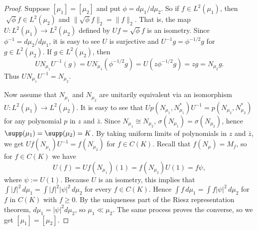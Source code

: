 \begin{proof}
Suppose $[\mu_1]=[\mu_2]$ and put $\phi=d\mu_1/d\mu_2$. So if $f\in L^2(\mu_1)$, then $\sqrt[]{\phi}f\in L^2(\mu_2)$ and $\|\sqrt{\phi}f\|_2=\|f\|_2$. That is, the map $U:L^2(\mu_1)\to L^2(\mu_2)$ defined by $Uf=\sqrt{\phi}f$ is an isometry. Since $\phi^{-1}=d\mu_2/d\mu_1$, it is easy to see $U$ is surjective and $U^{-1}g=\phi^{-1/2}g$ for $g\in L^2(\mu_2)$. If $g\in L^2(\mu_2)$, then
\[UN_{\mu_1}U^{-1}(g)=UN_{\mu_1}(\phi^{-1/2}g)=U(z\phi^{-1/2}g)=zg=N_{\mu_2}g.\]
Thus $UN_{\mu_1}U^{-1}=N_{\mu_2}$.\par
Now assume that $N_{\mu_1}$ and $N_{\mu_2}$ are unitarily equivalent via an isomorphism $U:L^2(\mu_1)\to L^2(\mu_2)$. It is easy to see that $Up(N_{\mu_1},N_{\mu_1}^*)U^{-1}=p(N_{\mu_2},N_{\mu_2}^*)$ for any polynomial $p$ in $z$ and $\bar{z}$. Since $N_{\mu_1}\cong N_{\mu_2}$, $\sigma(N_{\mu_1})=\sigma(N_{\mu_2})$, hence $\supp(\mu_1)=\supp(\mu_2)=K$. By taking uniform limits of polynomials in $z$ and $\bar{z}$, we get $Uf(N_{\mu_1})U^{-1}=f(N_{\mu_2})$ for $f\in C(K)$. Recall that $f(N_{\mu})=M_f$, so for $f\in C(K)$ we have
\[U(f)=Uf(N_{\mu_1})(1)=f(N_{\mu_2})U(1)=f\psi,\]
where $\psi:=U(1)$. Because $U$ is an isometry, this implies that $\int|f|^2\,d\mu_1=\int|f|^2|\psi|^2\,d\mu_2$ for every $f\in C(K)$. Hence $\int f\,d\mu_1=\int f|\psi|^2\,d\mu_2$ for $f$ in $C(K)$ with $f\geq 0$. By the uniqueness part of the Riesz representation theorem, $d\mu_1=|\psi|^2d\mu_2$, so $\mu_1\ll\mu_2$. The same process proves the converse, so we get $[\mu_1]=[\mu_2]$.
\end{proof}
